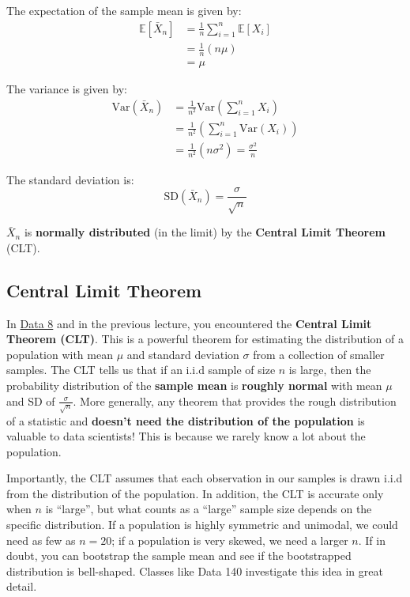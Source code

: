 \documentclass[
  letterpaper,
  DIV=11,
  numbers=noendperiod]{scrreprt}
\begin{document}
The expectation of the sample mean is given by: \[\begin{align} 
    \mathbb{E}[\bar{X}_n] &= \frac{1}{n} \sum_{i=1}^n \mathbb{E}[X_i] \\
    &= \frac{1}{n} (n \mu) \\
    &= \mu 
\end{align}\]

The variance is given by: \[\begin{align} 
    \text{Var}(\bar{X}_n) &= \frac{1}{n^2} \text{Var}( \sum_{i=1}^n X_i) \\
    &=  \frac{1}{n^2} \left( \sum_{i=1}^n \text{Var}(X_i) \right) \\
    &=  \frac{1}{n^2} (n \sigma^2) = \frac{\sigma^2}{n}
\end{align}\]

The standard deviation is:
\[ \text{SD}(\bar{X}_n) = \frac{\sigma}{\sqrt{n}} \]

\(\bar{X}_n\) is \textbf{normally distributed} (in the limit) by the
\textbf{Central Limit Theorem} (CLT).

\subsection{Central Limit Theorem}\label{central-limit-theorem}

In
\href{https://inferentialthinking.com/chapters/14/4/Central_Limit_Theorem.html?}{Data
8} and in the previous lecture, you encountered the \textbf{Central
Limit Theorem (CLT)}. This is a powerful theorem for estimating the
distribution of a population with mean \(\mu\) and standard deviation
\(\sigma\) from a collection of smaller samples. The CLT tells us that
if an i.i.d sample of size \(n\) is large, then the probability
distribution of the \textbf{sample mean} is \textbf{roughly normal} with
mean \(\mu\) and SD of \(\frac{\sigma}{\sqrt{n}}\). More generally, any
theorem that provides the rough distribution of a statistic and
\textbf{doesn't need the distribution of the population} is valuable to
data scientists! This is because we rarely know a lot about the
population.

Importantly, the CLT assumes that each observation in our samples is
drawn i.i.d from the distribution of the population. In addition, the
CLT is accurate only when \(n\) is ``large'', but what counts as a
``large'' sample size depends on the specific distribution. If a
population is highly symmetric and unimodal, we could need as few as
\(n=20\); if a population is very skewed, we need a larger \(n\). If in
doubt, you can bootstrap the sample mean and see if the bootstrapped
distribution is bell-shaped. Classes like Data 140 investigate this idea
in great detail.
\end{document}
